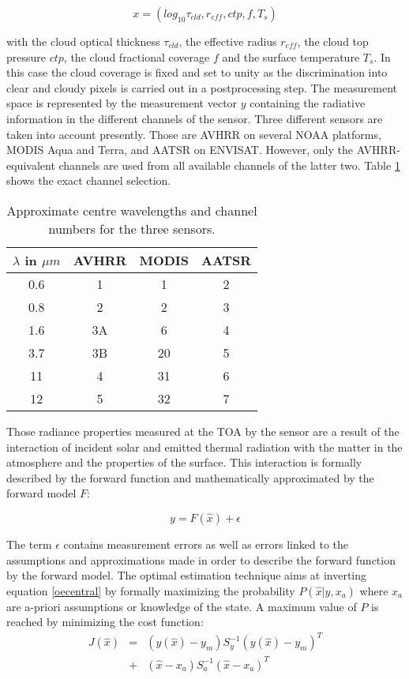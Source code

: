 \documentclass[amt]{style/copernicus}
\begin{document}
\begin{equation}
x=(log_{10} \tau_{cld},r_{eff},ctp,f,T_s)
\end{equation}

with the cloud optical thickness $\tau_{cld}$, the effective radius $r_{eff}$, the cloud top pressure $ctp$, the cloud fractional coverage $f$ and the surface temperature $T_s$. In this case the cloud coverage is fixed and set to unity as the discrimination into clear and cloudy pixels is carried out in a postprocessing step. The measurement space is represented by the measurement vector $y$ containing the radiative information in the different channels of the sensor. Three different sensors are taken into account presently. Those are AVHRR on several NOAA platforms, MODIS Aqua and Terra, and AATSR on ENVISAT. However, only the AVHRR-equivalent channels are used from all available channels of the latter two. Table \ref{channeltable} shows the exact channel selection.

\begin{table}
\caption{Approximate centre wavelengths and channel numbers for the three sensors.}
\begin{tabular}{cccc}\label{channeltable}
$\lambda$ in $\mu m$ &  AVHRR & MODIS & AATSR\\\hline
  0.6 & 1 &  1&  2 \\ 
  0.8 & 2 & 2 & 3\\\hline
  1.6 & 3A & 6 & 4\\\hline
  3.7 & 3B & 20 & 5\\
  11 & 4 & 31 & 6\\
  12 & 5 & 32 & 7\\
\end{tabular}
\end{table}

Those radiance properties measured at the TOA by the sensor are a result of the interaction of incident solar and emitted thermal radiation with the matter in the atmosphere and the properties of the surface. This interaction is formally described by the forward function and mathematically approximated by the forward model $F$:

\begin{equation}\label{oecentral}
y=F(\hat{x})+\epsilon
\end{equation}

The term $\epsilon$  contains measurement errors as well as errors linked to the assumptions and approximations made in order to describe the forward function by the forward model. The optimal estimation technique aims at inverting equation \ref{oecentral} by formally maximizing the probability $P(\hat{x}|y,x_a)$ where $x_a$ are a-priori assumptions or knowledge of the state. A maximum value of $P$ is reached by minimizing the cost function:
\begin{eqnarray}\label{cost}
J(\hat{x}) &=&(y(\hat{x})-y_m)S_y^{-1}(y(\hat{x})-y_m)^T\\\nonumber
               &+&(\hat{x}-x_a)S^{-1}_a(\hat{x}-x_a)^T
\end{eqnarray}
\end{document}
